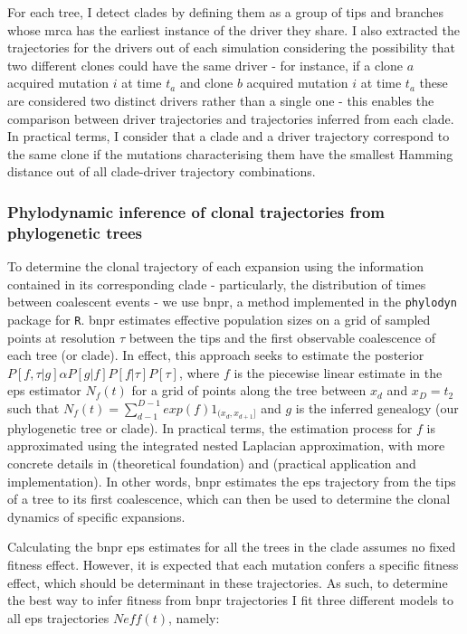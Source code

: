For each tree, I detect clades by defining them as a group of tips and branches whose \ac{mrca} has the earliest instance of the driver they share. I also extracted the trajectories for the drivers out of each simulation considering the possibility that two different clones could have the same driver - for instance, if a clone $a$ acquired mutation $i$ at time $t_a$ and clone $b$ acquired mutation $i$ at time $t_a$ these are considered two distinct drivers rather than a single one - this enables the comparison between driver trajectories and trajectories inferred from each clade. In practical terms, I consider that a clade and a driver trajectory correspond to the same clone if the mutations characterising them have the smallest Hamming distance out of all clade-driver trajectory combinations. 

\subsubsection{Phylodynamic inference of clonal trajectories from phylogenetic trees}

To determine the clonal trajectory of each expansion using the information contained in its corresponding clade - particularly, the distribution of times between coalescent events - we use \ac{bnpr}, a method implemented in the \texttt{phylodyn} \cite{Lan2015-sw,Karcher2017-kt} package for \texttt{R}. \ac{bnpr} estimates effective population sizes on a grid of sampled points at resolution $\tau$ between the tips and the first observable coalescence of each tree (or clade). In effect, this approach seeks to estimate the posterior $P[f,\tau|g]\alpha P[g|f]P[f|\tau]P[\tau]$, where $f$ is the piecewise linear estimate in the \ac{eps} estimator $N_f(t)$ for a grid of points along the tree between $x_d$ and $x_D=t_2$ such that $N_f(t) = \sum^{D-1}_{d-1}exp(f)1_{(x_d,x_{d+1}]}$ and $g$ is the inferred genealogy (our phylogenetic tree or clade). In practical terms, the estimation process for $f$ is approximated using the integrated nested Laplacian approximation, with more concrete details in \cite{Lan2015-sw} (theoretical foundation) and \cite{Karcher2017-kt} (practical application and implementation). In other words, \ac{bnpr} estimates the \ac{eps} trajectory from the tips of a tree to its first coalescence, which can then be used to determine the clonal dynamics of specific expansions.

Calculating the \ac{bnpr} \ac{eps} estimates for all the trees in the clade assumes no fixed fitness effect. However, it is expected that each mutation confers a specific fitness effect, which should be determinant in these trajectories. As such, to determine the best way to infer fitness from \ac{bnpr} trajectories I fit three different models to all \ac{eps} trajectories $Neff(t)$, namely:

